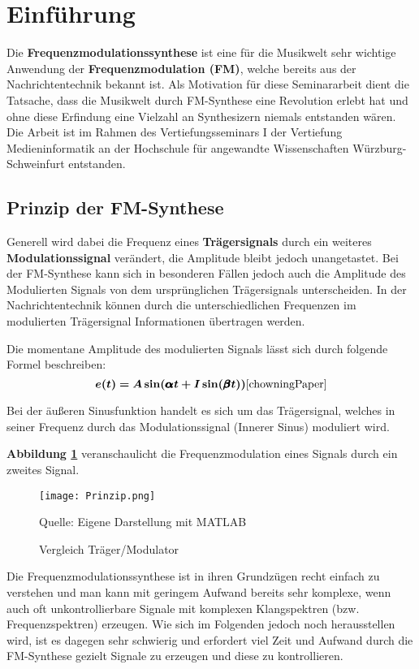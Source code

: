 \newpage
\section{Einführung}
Die \textbf{Frequenzmodulationssynthese} ist eine für die Musikwelt sehr wichtige Anwendung der \textbf{Frequenzmodulation (FM)}, welche bereits aus der Nachrichtentechnik bekannt ist. Als Motivation für diese Seminararbeit dient die Tatsache, dass die Musikwelt durch FM-Synthese eine Revolution erlebt hat und ohne diese Erfindung eine Vielzahl an Synthesizern niemals entstanden wären. Die Arbeit ist im Rahmen des Vertiefungsseminars I der Vertiefung Medieninformatik an der Hochschule für angewandte Wissenschaften Würzburg-Schweinfurt entstanden. %
\FloatBarrier
\subsection{Prinzip der FM-Synthese}
Generell wird dabei die Frequenz eines \textbf{Trägersignals} durch ein weiteres \textbf{Modulationssignal} verändert, die Amplitude bleibt jedoch unangetastet. Bei der FM-Synthese kann sich in besonderen Fällen jedoch auch die Amplitude des Modulierten Signals von dem ursprünglichen Trägersignals unterscheiden. In der Nachrichtentechnik können durch die unterschiedlichen Frequenzen im modulierten Trägersignal Informationen übertragen werden. 

Die momentane Amplitude des modulierten Signals lässt sich durch folgende Formel beschreiben:
\[
\bm{e(t) = A\sin(\pmb{\alpha} t + I\sin(\pmb{\beta} t))} \cite{chowningPaper}
\]

Bei der äußeren Sinusfunktion handelt es sich um das Trägersignal, welches in seiner Frequenz durch das Modulationssignal (Innerer Sinus) moduliert wird.

\textbf{Abbildung \ref{fig:vergleichSignale}} veranschaulicht die Frequenzmodulation eines Signals durch ein zweites Signal.

\begin{figure} [ht]
\centering
  \texttt{[image: Prinzip.png]}
\caption{Vergleich Träger/Modulator}
\label{fig:vergleichSignale}
Quelle: Eigene Darstellung mit MATLAB
\end{figure}
\FloatBarrier

Die Frequenzmodulationssynthese ist in ihren Grundzügen recht einfach zu verstehen und man kann mit geringem Aufwand bereits sehr komplexe, wenn auch oft unkontrollierbare Signale mit komplexen Klangspektren (bzw. Frequenzspektren) erzeugen. Wie sich im Folgenden jedoch noch herausstellen wird, ist es dagegen sehr schwierig und erfordert viel Zeit und Aufwand durch die FM-Synthese gezielt Signale zu erzeugen und diese zu kontrollieren.


